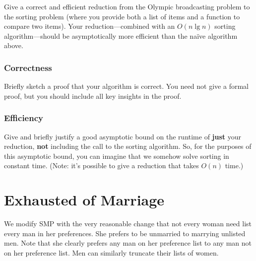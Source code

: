 \documentclass[11pt, oneside]{article}   	%
\theoremstyle{definition}
\theoremstyle{remark}
\begin{document}
Give a correct and efficient reduction from the Olympic broadcasting
problem to the sorting problem (where you provide both a list of items
and a function to compare two items). Your reduction---combined with
an $O(n \lg n)$ sorting algorithm---should be asymptotically more
efficient than the na\"ive algorithm above.
\subsubsection{Correctness}

Briefly sketch a proof that your algorithm is correct. You need not
give a formal proof, but you should include all key insights in the
proof.
\subsubsection{Efficiency}

Give and briefly justify a good asymptotic bound on the runtime
of \textbf{just} your reduction, \textbf{not} including the call to the sorting
algorithm. So, for the purposes of this asymptotic bound, you can
imagine that we somehow solve sorting in constant time. (Note: it's
possible to give a reduction that takes $O(n)$ time.)




\section{Exhausted of Marriage}

We modify SMP with the very reasonable change that not every woman
need list every man in her preferences. She prefers to be unmarried to
marrying unlisted men. Note that she clearly prefers any man on her
preference list to any man not on her preference list. Men can
similarly truncate their lists of women.
\end{document}
